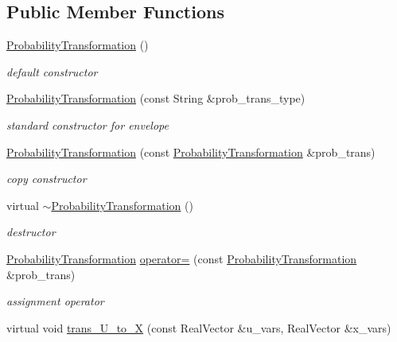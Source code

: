 \subsection*{Public Member Functions}
\begin{DoxyCompactItemize}
\item 
\hyperlink{classPecos_1_1ProbabilityTransformation_a8ef8b084547104fc1e3cba0756fdb91a}{Probability\+Transformation} ()
\begin{DoxyCompactList}\small\item\em default constructor \end{DoxyCompactList}\item 
\hyperlink{classPecos_1_1ProbabilityTransformation_a6a16a8332ca36a946d1101ebbc4cf3eb}{Probability\+Transformation} (const String \&prob\+\_\+trans\+\_\+type)
\begin{DoxyCompactList}\small\item\em standard constructor for envelope \end{DoxyCompactList}\item 
\hyperlink{classPecos_1_1ProbabilityTransformation_ae39a9ba792d517d9ea6cc5e2a829acc6}{Probability\+Transformation} (const \hyperlink{classPecos_1_1ProbabilityTransformation}{Probability\+Transformation} \&prob\+\_\+trans)
\begin{DoxyCompactList}\small\item\em copy constructor \end{DoxyCompactList}\item 
virtual \hyperlink{classPecos_1_1ProbabilityTransformation_a0f7a9045890c3aabc84190b79a629b15}{$\sim$\+Probability\+Transformation} ()
\begin{DoxyCompactList}\small\item\em destructor \end{DoxyCompactList}\item 
\hyperlink{classPecos_1_1ProbabilityTransformation}{Probability\+Transformation} \hyperlink{classPecos_1_1ProbabilityTransformation_aa88c97b8a328b011ccafd644c4327e39}{operator=} (const \hyperlink{classPecos_1_1ProbabilityTransformation}{Probability\+Transformation} \&prob\+\_\+trans)
\begin{DoxyCompactList}\small\item\em assignment operator \end{DoxyCompactList}\item 
virtual void \hyperlink{classPecos_1_1ProbabilityTransformation_a0a84860a9ed0cec52ed100edb49f209c}{trans\+\_\+\+U\+\_\+to\+\_\+X} (const Real\+Vector \&u\+\_\+vars, Real\+Vector \&x\+\_\+vars)\label{classPecos_1_1ProbabilityTransformation_a0a84860a9ed0cec52ed100edb49f209c}


\end{DoxyCompactItemize}
